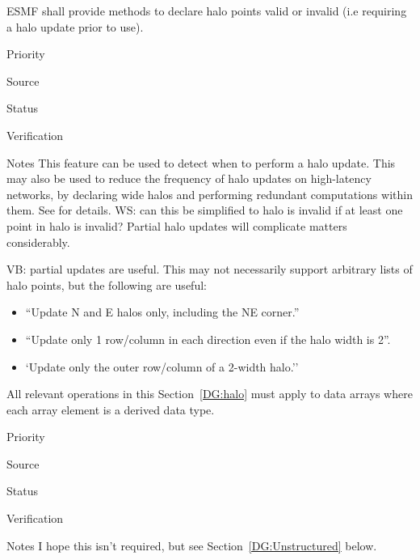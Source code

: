 
ESMF shall provide methods to declare halo points valid or invalid
(i.e requiring a halo update prior to use).

\begin{reqlist}
\item[Priority]
\item[Source]
\item[Status]
\item[Verification]
\item[Notes] This feature can be used to detect when to perform a halo
  update. This may also be used to reduce the frequency of halo
  updates on high-latency networks, by declaring wide halos and
  performing redundant computations within them. See \cite{ref:b2001}
  for details.  WS:  can this be simplified to halo is invalid
  if at least one point in halo is invalid?  Partial halo updates
  will complicate matters considerably.

  VB: partial updates are useful. This may not necessarily support
  arbitrary lists of halo points, but the following are useful:
  \begin{itemize}
  \item ``Update N and E halos only, including the NE corner.''
  \item ``Update only 1 row/column in each direction even if the halo
    width is 2''.
  \item `Update only the outer row/column of a 2-width halo.''
  \end{itemize}
\end{reqlist}


All relevant operations in this Section~\ref{DG:halo} must apply to
data arrays where each array element is a derived data type.

\begin{reqlist}
\item[Priority]
\item[Source]
\item[Status]
\item[Verification]
\item[Notes] I hope this isn't required, but see
  Section~\ref{DG:Unstructured} below.
\end{reqlist}

 \label{DG:Transpose}


